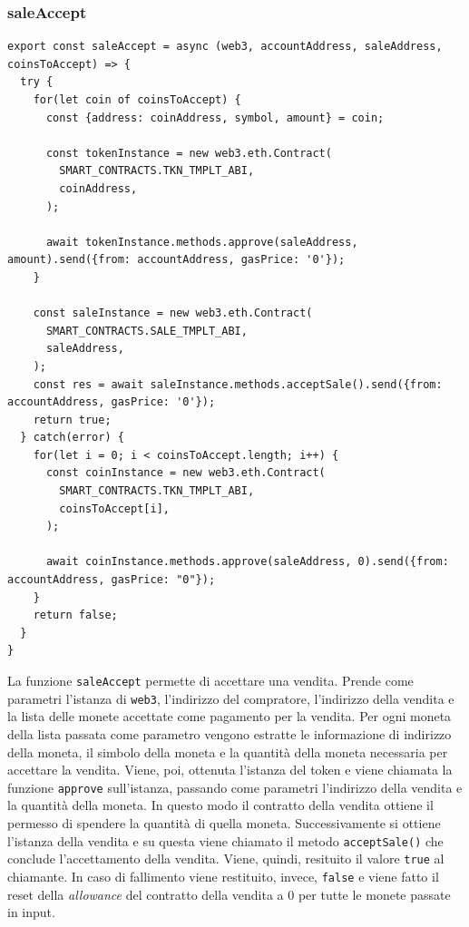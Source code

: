 \documentclass[a4paper]{article}
\begin{document}
        \subsubsection{saleAccept}
        \begin{lstlisting}[style=ES6, title={Funzione saleAccept}]
export const saleAccept = async (web3, accountAddress, saleAddress, coinsToAccept) => {
  try {
    for(let coin of coinsToAccept) {
      const {address: coinAddress, symbol, amount} = coin;

      const tokenInstance = new web3.eth.Contract(
        SMART_CONTRACTS.TKN_TMPLT_ABI,
        coinAddress,
      );

      await tokenInstance.methods.approve(saleAddress, amount).send({from: accountAddress, gasPrice: '0'});
    }

    const saleInstance = new web3.eth.Contract(
      SMART_CONTRACTS.SALE_TMPLT_ABI,
      saleAddress,
    );
    const res = await saleInstance.methods.acceptSale().send({from: accountAddress, gasPrice: '0'});
    return true;
  } catch(error) {
    for(let i = 0; i < coinsToAccept.length; i++) {
      const coinInstance = new web3.eth.Contract(
        SMART_CONTRACTS.TKN_TMPLT_ABI,
        coinsToAccept[i],
      );

      await coinInstance.methods.approve(saleAddress, 0).send({from: accountAddress, gasPrice: "0"});
    }
    return false;
  }
}\end{lstlisting}
        La funzione \verb|saleAccept| permette di accettare una vendita. Prende come parametri l'istanza di \verb|web3|, l'indirizzo del compratore, l'indirizzo della vendita e la lista delle monete accettate come pagamento per la vendita.
        \newline
        Per ogni moneta della lista passata come parametro vengono estratte le informazione di indirizzo della moneta, il simbolo della moneta e la quantità della moneta necessaria per accettare la vendita.
        Viene, poi, ottenuta l'istanza del token e viene chiamata la funzione \verb|approve| sull'istanza, passando come parametri l'indirizzo della vendita e la quantità della moneta. In questo modo il contratto della vendita ottiene il permesso
        di spendere la quantità di quella moneta.
        \newline
        Successivamente si ottiene l'istanza della vendita e su questa viene chiamato il metodo \verb|acceptSale()| che conclude l'accettamento della vendita. Viene, quindi, resituito il valore \verb|true| al chiamante.
        In caso di fallimento viene restituito, invece, \verb|false| e viene fatto il reset della \emph{allowance} del contratto della vendita a 0 per tutte le monete passate in input.
\end{document}
